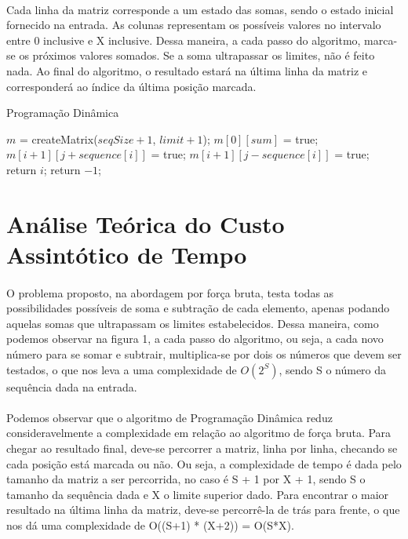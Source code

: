 \documentclass[a4paper, 12pt]{article}
\begin{document}
\paragraph{}
Cada linha da matriz corresponde a um estado das somas, sendo o estado inicial fornecido na entrada. As colunas representam os possíveis valores no intervalo entre 0 inclusive e X inclusive. Dessa maneira, a cada passo do algoritmo, marca-se os próximos valores somados. Se a soma ultrapassar os limites, não é feito nada. Ao final do algoritmo, o resultado estará na última linha da matriz e corresponderá ao índice da última posição marcada.

\begin{algorithm}
\caption{Programação Dinâmica}
\begin{algorithmic}
    \State $m$ = createMatrix($seqSize + 1$, $limit + 1$);
	\State $m[0][sum]$ = true;    
					\State $m[i+1][j + sequence[i]]$ = true;
				\EndIf
					\State $m[i+1][j - sequence[i]]$ = true;
				\EndIf
			\EndIf
		\EndFor
    \EndFor
		    	\State return $i$;
		    \EndIf
    \EndFor
    \State return $-1$;
\EndFunction
\end{algorithmic}
\end{algorithm}


\section{Análise Teórica do Custo Assintótico de Tempo}
\paragraph{}
O problema proposto, na abordagem por força bruta, testa todas as possibilidades possíveis de soma e subtração de cada elemento, apenas podando aquelas somas que ultrapassam os limites estabelecidos. Dessa maneira, como podemos observar na figura 1, a cada passo do algoritmo, ou seja, a cada novo número para se somar e subtrair, multiplica-se por dois os números que devem ser testados, o que nos leva a uma complexidade de {\(O(2^S)\)}, sendo S o número da sequência dada na entrada.

\paragraph{}
Podemos observar que o algoritmo de Programação Dinâmica reduz consideravelmente a complexidade em relação ao algoritmo de força bruta. Para chegar ao resultado final, deve-se percorrer a matriz, linha por linha, checando se cada posição está marcada ou não. Ou seja, a complexidade de tempo é dada pelo tamanho da matriz a ser percorrida, no caso é S + 1 por X + 1, sendo S o tamanho da sequência dada e X o limite superior dado. Para encontrar o maior resultado na última linha da matriz, deve-se percorrê-la de trás para frente, o que nos dá uma complexidade de O((S+1) * (X+2)) = O(S*X).
\end{document}
